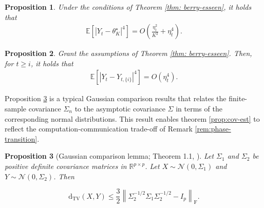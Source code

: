 \documentclass[a4paper,11pt]{article}
\numberwithin{equation}{section}
\theoremstyle{plain}
\newtheorem{proposition}{Proposition}
\theoremstyle{remark}
\def\IE{\mathbb{E}}
\newcommand{\shift}[2]{#1_{#2, \{i\}}}
\newcommand{\minparam}{\theta^\star_K}
\begin{document}
\begin{proposition}\label{prop:fourth-moment-original}
   Under the conditions of Theorem \ref{thm: berry-esseen}, it holds that
    \begin{align} \label{eq:fourth-moment-original}
        \IE[|Y_t - \minparam|^4]=O(\frac{\eta_t^2}{K^2} + \eta_t^4).
    \end{align}
\end{proposition}

\begin{proposition}\label{prop:shift-fourth-moment}
    Grant the assumptions of Theorem \ref{thm: berry-esseen}. Then, for $t\geq i$, it holds that
    \begin{align}\label{eq:shift-fourth-moment}
        \IE[|Y_t - \shift{Y}{t}|^4] = O({\eta_t^4}).
    \end{align}
\end{proposition}

Proposition \ref{prop:ga-comp} is a typical Gaussian comparison results that relates the finite-sample covariance $\Sigma_n$ to the asymptotic covariance $\Sigma$ in terms of the corresponding normal distributions. This result enables theorem \ref{prop:cov-est} to reflect the computation-communication trade-off of Remark \ref{rem:phase-transition}.

\begin{proposition}[Gaussian comparison lemma; Theorem 1.1, \cite{devroye2018total}]\label{prop:ga-comp}
 Let $\Sigma_1$ and $\Sigma_2$ be positive definite covariance matrices in $\mathbb{R}^{p \times p}$. Let $X \sim \mathcal{N}\left(0, \Sigma_1\right)$ and $Y \sim \mathcal{N}\left(0, \Sigma_2\right)$. Then

$$
\mathrm{d}_{\mathrm{TV}}(X, Y) \leq \frac{3}{2}\left\|\Sigma_2^{-1 / 2} \Sigma_1 \Sigma_2^{-1 / 2}-I_p\right\|_{\mathrm{F}} .
$$

\end{proposition}
 
\end{document}
